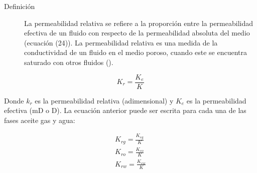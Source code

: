 \begin{description}
    \item[Definición]La permeabilidad relativa se refiere a la proporción entre la permeabilidad efectiva de un fluido con respecto de la permeabilidad absoluta del medio (ecuación (24)). La permeabilidad relativa es una medida de la conductividad de un fluido en el medio poroso, cuando este se encuentra saturado con otros fluidos (\cite{Dandekar}). 
\end{description}

\begin{equation}
K_{r}=\frac{K_{e}}{K}
\end{equation}

Donde $k_{r}$ es la permeabilidad relativa (adimensional) y $K_{e}$ es la permeabilidad efectiva (mD o D).
La ecuación anterior puede ser escrita para cada una de las fases aceite gas y agua:

\begin{gather}
K_{rg}=\frac{K_{eg}}{K} \\
K_{ro}=\frac{K_{eo}}{K} \\
K_{rw}=\frac{K_{ew}}{K}
\end{gather}
